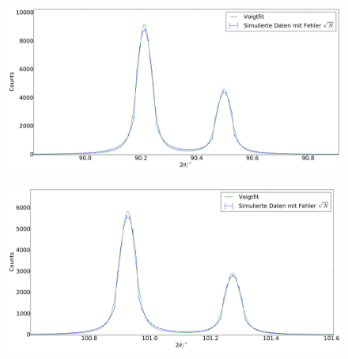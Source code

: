 \begin{figure}[H]
\begin{minipage}{.52\textwidth}
  \centering
  \includegraphics[scale=0.18]{Simulation_Germaniumpulver_7}
  \label{fig:pul_sim_ger_7}
\end{minipage}
\hspace{0.2cm}
\begin{minipage}{.52\textwidth}
  \centering
  \includegraphics[scale=0.18]{Simulation_Germaniumpulver_8}
  \label{fig:pul_sim_ger_8}
\end{minipage}
\end{figure}
